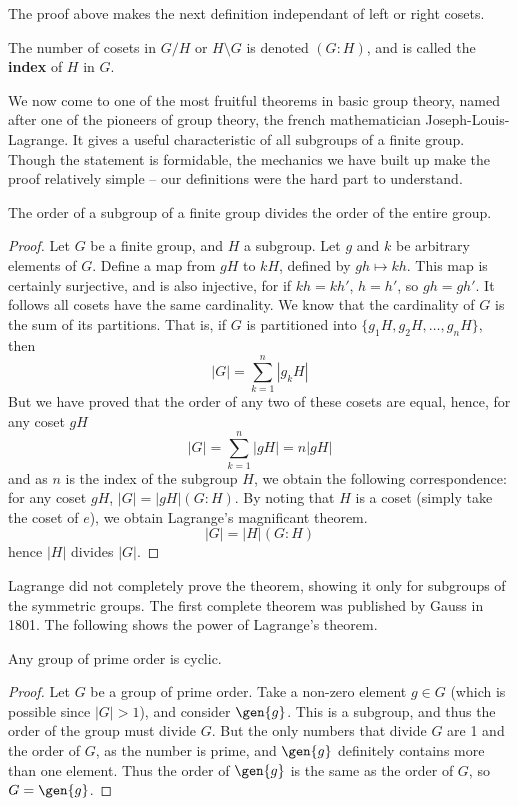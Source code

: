 The proof above makes the next definition independant of left or right cosets.

\begin{definition}
    The number of cosets in $G/H$ or $H \setminus G$ is denoted $(G:H)$, and is called the {\bf index}  of $H$ in $G$.
\end{definition}

We now come to one of the most fruitful theorems in basic group theory, named after one of the pioneers of group theory, the french mathematician Joseph-Louis-Lagrange. It gives a useful characteristic of all subgroups of a finite group. Though the statement is formidable, the mechanics we have built up make the proof relatively simple -- our definitions were the hard part to understand.

\begin{theorem} 
    The order of a subgroup of a finite group divides the order of the entire group.
\end{theorem}
\begin{proof}
Let $G$ be a finite group, and $H$ a subgroup. Let $g$ and $k$ be arbitrary elements of $G$. Define a map from $gH$ to $kH$, defined by $gh \mapsto kh$. This map is certainly surjective, and is also injective, for if $kh = kh'$, $h = h'$, so $gh = gh'$. It follows all cosets have the same cardinality. We know that the cardinality of $G$ is the sum of its partitions. That is, if $G$ is partitioned into $\{ g_1H, g_2H, \dots, g_nH \}$, then
%
\[ |G| = \sum_{k = 1}^n |g_kH| \]
%
But we have proved that the order of any two of these cosets are equal, hence, for any coset $gH$
%
\[ |G| = \sum_{k = 1}^n |gH| = n|gH| \]
%
and as $n$ is the index of the subgroup $H$, we obtain the following correspondence: for any coset $gH$, $|G| = |gH|(G:H)$. By noting that $H$ is a coset (simply take the coset of $e$), we obtain Lagrange's magnificant theorem.
%
\[ |G| = |H|(G:H) \]
%
hence $|H|$ divides $|G|$.
\end{proof}

Lagrange did not completely prove the theorem, showing it only for subgroups of the symmetric groups. The first complete theorem was published by Gauss in 1801. The following shows the power of Lagrange's theorem.

\begin{corollary} Any group of prime order is cyclic. \end{corollary}
\begin{proof}
    Let $G$ be a group of prime order. Take a non-zero element $g \in G$ (which is possible since $|G| > 1$), and consider $\gen{g}$. This is a subgroup, and thus the order of the group must divide $G$. But the only numbers that divide $G$ are 1 and the order of $G$, as the number is prime, and $\gen{g}$ definitely contains more than one element. Thus the order of $\gen{g}$ is the same as the order of $G$, so $G = \gen{g}$.
\end{proof}

